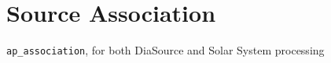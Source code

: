 \section{Source Association}

\texttt{ap\_association}, for both DiaSource and Solar System processing
